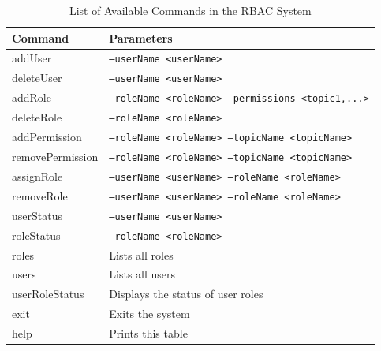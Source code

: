 \begin{table}[ht]
   \centering
   \renewcommand{\arraystretch}{1.5}
   \begin{tabular}{|l|l|}
   \hline
   \textbf{Command} & \textbf{Parameters} \\
   \hline
   addUser & \texttt{--userName <userName>} \\
   \hline
   deleteUser & \texttt{--userName <userName>} \\
   \hline
   addRole & \texttt{--roleName <roleName> --permissions <topic1,...>} \\
   \hline
   deleteRole & \texttt{--roleName <roleName>} \\
   \hline
   addPermission & \texttt{--roleName <roleName> --topicName <topicName>} \\
   \hline
   removePermission & \texttt{--roleName <roleName> --topicName <topicName>} \\
   \hline
   assignRole & \texttt{--userName <userName> --roleName <roleName>} \\
   \hline
   removeRole & \texttt{--userName <userName> --roleName <roleName>} \\
   \hline
   userStatus & \texttt{--userName <userName>} \\
   \hline
   roleStatus & \texttt{--roleName <roleName>} \\
   \hline
   roles & Lists all roles \\
   \hline
   users & Lists all users \\
   \hline
   userRoleStatus & Displays the status of user roles \\
   \hline
   exit & Exits the system \\
   \hline
   help & Prints this table \\
   \hline
   \end{tabular}
   \caption{List of Available Commands in the RBAC System}
   \label{table:rbac_commands}
   \end{table}
   
